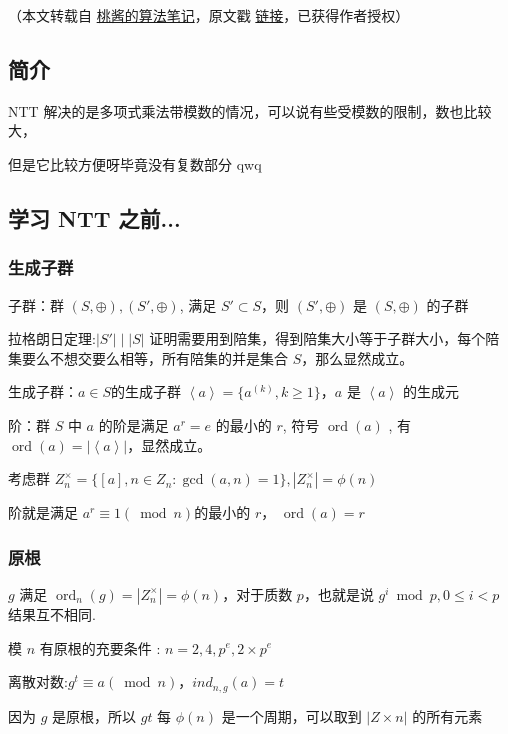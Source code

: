 
（本文转载自 \href{https://zhuanlan.zhihu.com/c_1005817911142838272}{桃酱的算法笔记}，原文戳 \href{https://zhuanlan.zhihu.com/p/41867199}{链接}，已获得作者授权）

\subsection{简介}

NTT 解决的是多项式乘法带模数的情况，可以说有些受模数的限制，数也比较大，

但是它比较方便呀毕竟没有复数部分 qwq

\subsection{学习 NTT 之前...}

\subsubsection{生成子群}

子群：群 $(S,⊕), (S′,⊕)$, 满足 $S′⊂S$，则 $(S′,⊕)$ 是 $(S,⊕)$ 的子群

拉格朗日定理:$|S′|∣|S |$ 证明需要用到陪集，得到陪集大小等于子群大小，每个陪集要么不想交要么相等，所有陪集的并是集合 $S$，那么显然成立。

生成子群：$a \in S$ ​的生成子群 $\left<a\right> = \{a^{(k)}, k \geq 1 \}$ ​，$a$ 是 $\left< a \right>$ 的生成元

阶：群 $S$ 中 $a$ 的阶是满足 $a^r=e$ 的最小的 $r$, 符号 $\operatorname{ord}(a)$ , 有 $\operatorname{ord}(a)=\left|\left<a\right>\right|$，显然成立。

考虑群 $Z_n^ \times =\{[a], n \in Z_n : \gcd(a, n) = 1\}, |Z_n^ \times | = \phi(n)$

阶就是满足 $a^r \equiv 1 (\bmod n)$ ​的最小的 $r$，  $\operatorname{ord}(a)=r$

\subsubsection{ 原根 }

$g$ 满足 $\operatorname{ord}_n(g)=\left|Z_n^\times\right|=\phi(n)$，对于质数 $p$，也就是说 $g^i \bmod p, 0 \leq i < p$ 结果互不相同.

模 $n$ 有原根的充要条件 : $n = 2, 4, p^e, 2 \times p^e$

离散对数:$g^t \equiv a (\bmod n)，ind_{n,g}{(a)}=t$

​因为 $g$ 是原根，所以 $gt$ 每 $\phi(n)$ 是一个周期，可以取到 $| Z \times n |$ 的所有元素

